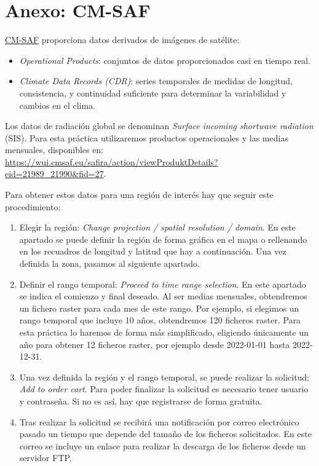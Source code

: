 \documentclass[11pt]{article}
\begin{document}
\clearpage

\clearpage

\section{Anexo: CM-SAF}
\label{sec:cmsaf}
\href{https://wui.cmsaf.eu/safira/action/viewProduktSearch}{CM-SAF}
proporciona datos derivados de imágenes de satélite:
\begin{itemize}
\item \emph{Operational Products}: conjuntos de datos proporcionados casi en
  tiempo real.

\item \emph{Climate Data Records (CDR)}: series temporales de medidas de
  longitud, consistencia, y continuidad suficiente para determinar la
  variabilidad y cambios en el clima.
\end{itemize}

Los datos de radiación global se denominan \emph{Surface incoming
  shortwave radiation} (SIS). Para esta práctica utilizaremos
productos operacionales y las medias mensuales, disponibles
en:
\url{https://wui.cmsaf.eu/safira/action/viewProduktDetails?eid=21989_21990&fid=27}.

Para obtener estos datos para una región de interés hay que seguir
este procedimiento:
\begin{enumerate}
\item Elegir la región: \emph{Change projection / spatial resolution /
    domain}. En este apartado se puede definir la región de forma
  gráfica en el mapa o rellenando en los recuadros de longitud y
  latitud que hay a continuación. Una vez definida la zona, pasamos al
  siguiente apartado.
\item Definir el rango temporal: \emph{Proceed to time range
    selection}. En este apartado se indica el comienzo y final
  deseado. Al ser medias mensuales, obtendremos un fichero raster para
  cada mes de este rango. Por ejemplo, si elegimos un rango temporal
  que incluye 10 años, obtendremos 120 ficheros raster. Para esta
  práctica lo haremos de forma más simplificado, eligiendo únicamente
  un año para obtener 12 ficheros raster, por ejemplo desde 2022-01-01
  hasta 2022-12-31.
\item Una vez definida la región y el rango temporal, se puede
  realizar la solicitud: \emph{Add to order cart}. Para poder
  finalizar la solicitud es necesario tener usuario y contraseña. Si
  no es así, hay que registrarse de forma gratuita.
\item Tras realizar la solicitud se recibirá una notificación por
  correo electrónico pasado un tiempo que depende del tamaño de los
  ficheros solicitados. En este correo se incluye un enlace para
  realizar la descarga de los ficheros desde un servidor FTP.
\end{enumerate}
\end{document}

